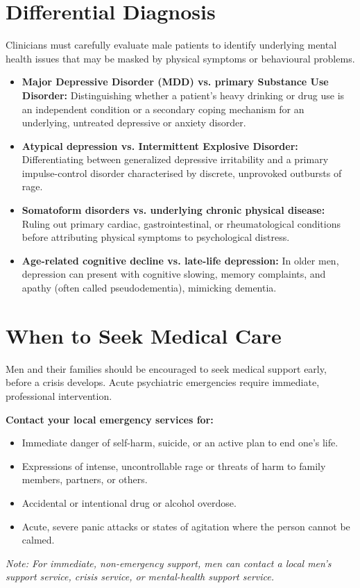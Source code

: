 \section*{Differential Diagnosis}
Clinicians must carefully evaluate male patients to identify underlying mental health issues that may be masked by physical symptoms or behavioural problems.
\begin{itemize}
    \item \textbf{Major Depressive Disorder (MDD) vs. primary Substance Use Disorder:} Distinguishing whether a patient's heavy drinking or drug use is an independent condition or a secondary coping mechanism for an underlying, untreated depressive or anxiety disorder.
    \item \textbf{Atypical depression vs. Intermittent Explosive Disorder:} Differentiating between generalized depressive irritability and a primary impulse-control disorder characterised by discrete, unprovoked outbursts of rage.
    \item \textbf{Somatoform disorders vs. underlying chronic physical disease:} Ruling out primary cardiac, gastrointestinal, or rheumatological conditions before attributing physical symptoms to psychological distress.
    \item \textbf{Age-related cognitive decline vs. late-life depression:} In older men, depression can present with cognitive slowing, memory complaints, and apathy (often called pseudodementia), mimicking dementia.
\end{itemize}

\section*{When to Seek Medical Care}
Men and their families should be encouraged to seek medical support early, before a crisis develops. Acute psychiatric emergencies require immediate, professional intervention.

\textbf{Contact your local emergency services for:}
\begin{itemize}
    \item Immediate danger of self-harm, suicide, or an active plan to end one's life.
    \item Expressions of intense, uncontrollable rage or threats of harm to family members, partners, or others.
    \item Accidental or intentional drug or alcohol overdose.
    \item Acute, severe panic attacks or states of agitation where the person cannot be calmed.
\end{itemize}
\textit{Note: For immediate, non-emergency support, men can contact a local men's support service, crisis service, or mental-health support service.}

